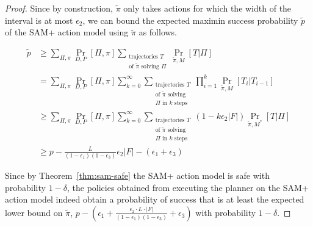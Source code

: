 \documentclass[letterpaper]{article} %
\begin{document}
\begin{proof}
Since by construction, $\tilde{\pi}$ only takes actions for which the width of the interval is at most $\epsilon_2$, we can bound the expected maximin success probability $\tilde{p}$ of the SAM+ action model using $\tilde{\pi}$ as follows.
\begin{small}
\begin{align*}
\tilde{p} &\geq \sum_{\Pi,\pi}\Pr_{D,P}[\Pi,\pi]\sum_{\substack{\text{trajectories }T\\\text{of }\tilde{\pi}\text{ solving }\Pi}}\Pr_{\tilde{\pi},M}[T|\Pi]\\
&=\sum_{\Pi,\pi}\Pr_{D,P}[\Pi,\pi]\sum_{k=0}^\infty\sum_{\substack{\text{trajectories }T\\\text{of }\tilde{\pi}\text{ solving}\\
\Pi\text{ in }k\text{ steps}}}\prod_{i=1}^k\Pr_{\tilde{\pi},M}[T_i|T_{i-1}]\\
&\geq \sum_{\Pi,\pi}\Pr_{D,P}[\Pi,\pi]\sum_{k=0}^\infty\sum_{\substack{\text{trajectories }T\\\text{of }\tilde{\pi}\text{ solving}\\
\Pi\text{ in }k\text{ steps}}}(1-k\epsilon_2|F|)\Pr_{\tilde{\pi},M^*}[T|\Pi]\\
&\geq p-\frac{L}{(1-\epsilon_1)(1-\epsilon_3)}\epsilon_2|F|-(\epsilon_1+\epsilon_3)
\end{align*}
\end{small}

Since by Theorem~\ref{thm:sam-safe} the SAM+ action model is safe with probability $1-\delta$, the policies obtained from executing the planner on the SAM+ action model indeed obtain a probability of success that is at least the expected lower bound on $\tilde{\pi}$, $p-(\epsilon_1+\frac{\epsilon_2\cdot L\cdot |F|}{(1-\epsilon_1)(1-\epsilon_3)}+\epsilon_3)$ with probability $1-\delta$.
\end{proof}
\end{document}
